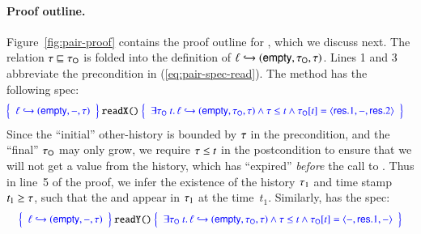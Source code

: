 \paragraph{Proof outline.}
Figure~\ref{fig:pair-proof} contains the proof outline for
, which we discuss next. The relation $\tau \sqsubseteq
\tau_{\mathsf{O}}$ is folded into the definition of ${\ell} \hookrightarrow ({\mathsf{empty},
  \tau_{\mathsf{O}}, \tau})$. Lines 1 and 3 abbreviate the precondition in
(\ref{eq:pair-spec-read}). The  method has the following
spec:
%
%
\[
{\small
\hspace{-3.5mm}
\begin{array}{r@{\ }c@{\ }l}
\spec{
  \begin{array}{l}
    \histso{\hps}{\hempty, -, \hist}
  \end{array}
} &\Cmd{readX}{} & 
\spec{ 
  \begin{array}{l}
    \exists \histO\ t\ldot \histso{\hps}{\hempty, \histO, \hist} \aand \hist \le t \aand  \inat{\angled{\res.1, -, \res.2}}{\histO}{t}
  \end{array}
}
\end{array}
}
\]
%
Since the ``initial'' other-history is bounded by $\tau$ in the
precondition, and the ``final'' $\tau_{\mathsf{O}}$ may only grow, we require
$\tau \le t$ in the postcondition to ensure that we will not get a value
from the history, which has ``expired'' \emph{before} the call to
.
%
Thus in line~5 of the proof, we infer the existence of the
history $\tau_1$ and time stamp $t_1 \geq \tau$, such that the
 and  appear in $\tau_1$ at the time~$t_1$. 
%
Similarly,  has the spec:
\[
{\small
\begin{array}{r@{\ }c@{\ }l}
\spec{
  \begin{array}{l}
    \histso{\hps}{\hempty, -, \hist}
  \end{array}
} & \Cmd{readY}{} & 
\spec{ 
  \begin{array}{l}
    \exists \histO\ t\ldot \histso{\hps}{\hempty, \histO, \hist} \aand \hist \le t \aand \inat{\angled{-, \res.1, -}}{\histO}{t}
  \end{array}
}
\end{array}
}
\]
%

